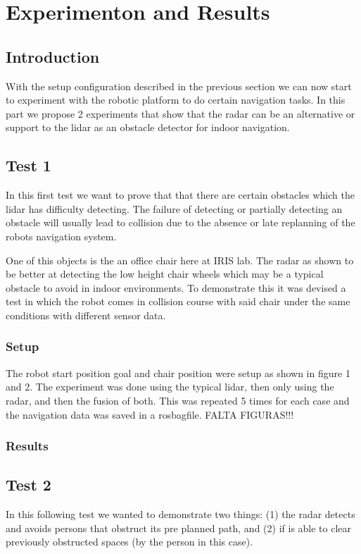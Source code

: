 \chapter{Experimenton and Results}

\section{Introduction}
With the setup configuration described in the previous section we can now start to experiment with the robotic platform to do certain navigation tasks. In this part we propose 2 experiments that show that the radar can be an alternative or support to the lidar as an obstacle detector for indoor navigation.

\section {Test 1}
In this first test we want to prove that that there are certain obstacles which the lidar has difficulty detecting. The failure of detecting or partially detecting an obstacle will usually lead to collision due to the absence or late replanning of the robots navigation system.

One of this objects is the an office chair here at IRIS lab. The radar as shown to  be better at detecting the low height chair wheels which may be a typical obstacle to avoid in indoor environments. To demonstrate this it was devised a test in which the robot comes in collision course with said chair under the same conditions with different sensor data. 
\subsection{Setup}
The robot start position goal and chair position were setup as shown in figure 1 and 2. The experiment was done using the typical lidar, then only using the radar, and then the fusion of both. This was repeated 5 times for each case and the navigation data was saved in a rosbagfile.
FALTA FIGURAS!!!
\subsection{Results}

\section {Test 2}
In this following test we wanted to demonstrate two things: (1) the radar detects and avoids persons that obstruct its pre planned path, and (2) if is able to clear previously obstructed spaces (by the person in this case). 
